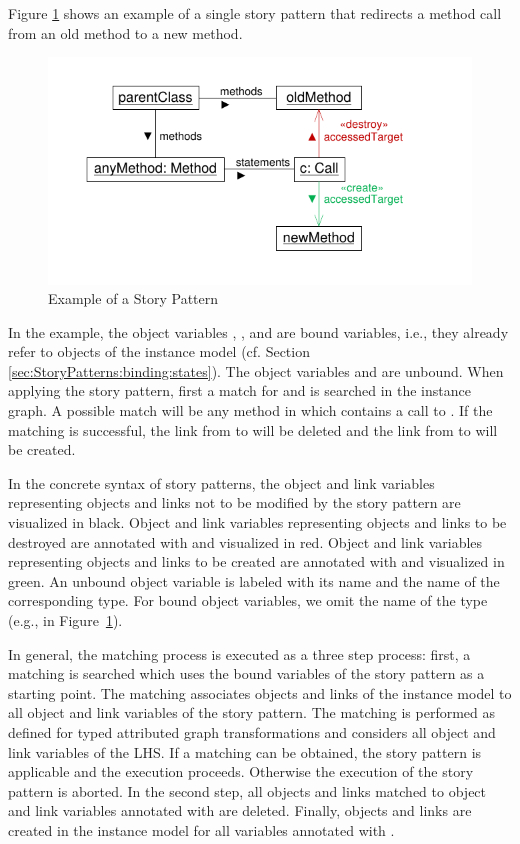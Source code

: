 Figure \ref{fig:simpleStoryPattern} shows an example of a single story pattern that redirects a method call from an old method to a new method.
\begin{figure}[htb]
  \centering
  \includegraphics[scale=1.0]{figures/SimpleStoryPattern}
  \caption{Example of a Story Pattern}
  \label{fig:simpleStoryPattern}
\end{figure}
In the example, the object variables , , and  are bound variables, i.e., they already refer to objects of the instance model (cf. Section \ref{sec:StoryPatterns:binding:states}).
The object variables  and  are unbound. 
When applying the story pattern, first a match for  and  is searched in the instance graph. 
A possible match will be any method in  which contains a call to . 
If the matching is successful, the link from  to  will be deleted and the link from  to  will be created.

In the concrete syntax of story patterns, the object and link variables representing objects and links not to be modified by the story pattern are visualized in black. 
Object and link variables representing objects and links to be destroyed are annotated with \destroy and visualized in red. 
Object and link variables representing objects and links to be created are annotated with \create and visualized in green. 
An unbound object variable is labeled with its name and the name of the corresponding type. 
For bound object variables, we omit the name of the type (e.g.,  in Figure~\ref{fig:simpleStoryPattern}).

In general, the matching process is executed as a three step process:
first, a matching is searched which uses the bound variables of the story pattern as a starting point. The matching associates objects and links of the instance model to all object and link variables of the story pattern. 
The matching is performed as defined for typed attributed graph transformations and considers all object and link variables of the LHS.
If a matching can be obtained, the story pattern is applicable and the execution proceeds. 
Otherwise the execution of the story pattern is aborted.
In the second step, all objects and links matched to object and link variables annotated with \destroy are deleted. 
Finally, objects and links are created in the instance model for all variables annotated with \create.

